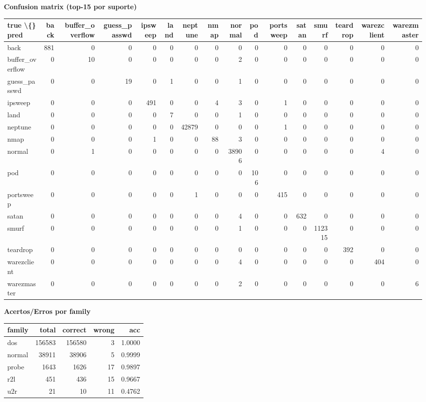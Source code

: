 \documentclass[11pt]{article}
\begin{document}
\begin{center}
\textbf{Confusion matrix (top-15 por suporte)}\par
\begin{longtable}{lrrrrrrrrrrrrrrr}
\toprule
true \textbackslash\{\} pred & back & buffer\_overflow & guess\_passwd & ipsweep & land & neptune & nmap & normal & pod & portsweep & satan & smurf & teardrop & warezclient & warezmaster \\
\midrule
back & 881 & 0 & 0 & 0 & 0 & 0 & 0 & 0 & 0 & 0 & 0 & 0 & 0 & 0 & 0 \\
buffer\_overflow & 0 & 10 & 0 & 0 & 0 & 0 & 0 & 2 & 0 & 0 & 0 & 0 & 0 & 0 & 0 \\
guess\_passwd & 0 & 0 & 19 & 0 & 1 & 0 & 0 & 1 & 0 & 0 & 0 & 0 & 0 & 0 & 0 \\
ipsweep & 0 & 0 & 0 & 491 & 0 & 0 & 4 & 3 & 0 & 1 & 0 & 0 & 0 & 0 & 0 \\
land & 0 & 0 & 0 & 0 & 7 & 0 & 0 & 1 & 0 & 0 & 0 & 0 & 0 & 0 & 0 \\
neptune & 0 & 0 & 0 & 0 & 0 & 42879 & 0 & 0 & 0 & 1 & 0 & 0 & 0 & 0 & 0 \\
nmap & 0 & 0 & 0 & 1 & 0 & 0 & 88 & 3 & 0 & 0 & 0 & 0 & 0 & 0 & 0 \\
normal & 0 & 1 & 0 & 0 & 0 & 0 & 0 & 38906 & 0 & 0 & 0 & 0 & 0 & 4 & 0 \\
pod & 0 & 0 & 0 & 0 & 0 & 0 & 0 & 0 & 106 & 0 & 0 & 0 & 0 & 0 & 0 \\
portsweep & 0 & 0 & 0 & 0 & 0 & 1 & 0 & 0 & 0 & 415 & 0 & 0 & 0 & 0 & 0 \\
satan & 0 & 0 & 0 & 0 & 0 & 0 & 0 & 4 & 0 & 0 & 632 & 0 & 0 & 0 & 0 \\
smurf & 0 & 0 & 0 & 0 & 0 & 0 & 0 & 1 & 0 & 0 & 0 & 112315 & 0 & 0 & 0 \\
teardrop & 0 & 0 & 0 & 0 & 0 & 0 & 0 & 0 & 0 & 0 & 0 & 0 & 392 & 0 & 0 \\
warezclient & 0 & 0 & 0 & 0 & 0 & 0 & 0 & 4 & 0 & 0 & 0 & 0 & 0 & 404 & 0 \\
warezmaster & 0 & 0 & 0 & 0 & 0 & 0 & 0 & 2 & 0 & 0 & 0 & 0 & 0 & 0 & 6 \\
\bottomrule
\end{longtable}
\end{center}

\begin{center}
\textbf{Acertos/Erros por family}\par
\begin{longtable}{lrrrr}
\toprule
family & total & correct & wrong & acc \\
\midrule
dos & 156583 & 156580 & 3 & 1.0000 \\
normal & 38911 & 38906 & 5 & 0.9999 \\
probe & 1643 & 1626 & 17 & 0.9897 \\
r2l & 451 & 436 & 15 & 0.9667 \\
u2r & 21 & 10 & 11 & 0.4762 \\
\bottomrule
\end{longtable}
\end{center}
\end{document}
